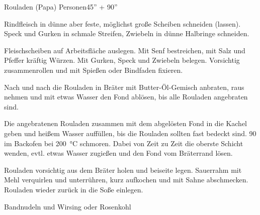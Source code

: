 \begin{MyRecipe}{Rouladen (Papa)}{ Personen}{45'' + 90''}


Rindfleisch in dünne aber feste, möglichst große Scheiben schneiden (lassen).\\
Speck und Gurken in schmale Streifen, Zwiebeln in dünne Halbringe schneiden.\par\bigskip


Fleischscheiben auf Arbeitsfläche auslegen. Mit Senf bestreichen, mit Salz und Pfeffer kräftig Würzen. Mit Gurken, Speck und Zwiebeln belegen. Vorsichtig zusammenrollen und mit Spießen oder Bindfaden fixieren.\par
Nach und nach die Rouladen in Bräter mit Butter-Öl-Gemisch anbraten, raus nehmen und mit etwas Wasser den Fond ablösen, bis alle Rouladen angebraten sind.\par
Die angebratenen Rouladen zusammen mit dem abgelösten Fond in die Kachel geben und heißem Wasser auffüllen, bis die Rouladen sollten fast bedeckt sind. \SI{90}{\min} im Backofen bei \SI{200}{\degreeCelsius} schmoren. Dabei von Zeit zu Zeit die oberste Schicht wenden, evtl. etwas Wasser zugießen und den Fond vom Bräterrand lösen.\par\bigskip


Rouladen vorsichtig aus dem Bräter holen und beiseite legen. Sauerrahm mit Mehl verquirlen und unterrühren, kurz aufkochen und mit Sahne abschmecken. Rouladen wieder zurück in die Soße einlegen.\par\bigskip


Bandnudeln und Wirsing oder Rosenkohl

\end{MyRecipe}